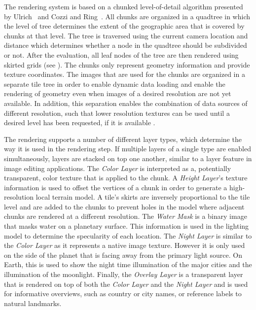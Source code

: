 The rendering system is based on a chunked level-of-detail algorithm presented by Ulrich~\cite{ulrich2002rendering} and Cozzi and Ring~\cite{cozzi20113d}.  All chunks are organized in a quadtree in which the level of tree determines the extent of the geographic area that is covered by chunks at that level.  The tree is traversed using the current camera location and distance which determines whether a node in the quadtree should be subdivided or not.  After the evaluation, all leaf nodes of the tree are then rendered using skirted grids (see ).  The chunks only represent geometry information and provide texture coordinates.  The images that are used for the chunks are organized in a separate tile tree in order to enable dynamic data loading and enable the rendering of geometry even when images of a desired resolution are not yet available.  In addition, this separation enables the combination of data sources of different resolution, such that lower resolution textures can be used until a desired level has been requested, if it is available .

The rendering supports a number of different layer types, which determine the way it is used in the rendering step.  If multiple layers of a single type are enabled simultaneously, layers are stacked on top one another, similar to a layer feature in image editing applications.  The \emph{Color Layer} is interpreted as a, potentially transparent, color texture that is applied to the chunk.  A \emph{Height Layer}'s texture information is used to offset the vertices of a chunk in order to generate a high-resolution  local terrain model.  A tile's skirts are inversely proportional to the tile level and are added to the chunks to prevent holes in the model where adjacent chunks are rendered at a different resolution.  The \emph{Water Mask} is a binary image that masks water on a planetary surface.  This information is used in the lighting model to determine the specularity of each location.  The \emph{Night Layer} is similar to the \emph{Color Layer} as it represents a native image texture.  However it is only used on the side of the planet that is facing away from the primary light source.  On Earth, this is used to show the night time illumination of the major cities and the illumination of the moonlight.  Finally, the \emph{Overlay Layer} is a transparent layer that is rendered on top of both the \emph{Color Layer} and the \emph{Night Layer} and is used for informative overviews, such as country or city names, or reference labels to natural landmarks.

